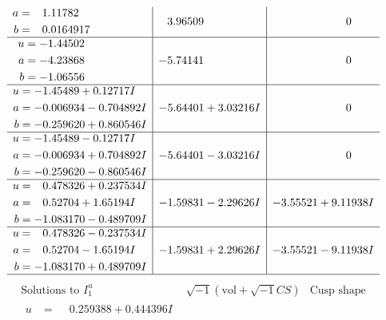 \documentclass[1p]{elsarticle_modified}
\theoremstyle{definition}
\newcommand{\I}{\sqrt{-1}}
\begin{document}
$$\begin{array}{c|c|c}
\begin{aligned}
a &= \phantom{-}1.11782\phantom{ +0.000000I} \\
b &= \phantom{-}0.0164917\phantom{ +0.000000I}\end{aligned}
 & \phantom{-}3.96509\phantom{ +0.000000I} & \phantom{-0.000000 } 0 \\ \hline\begin{aligned}
u &= -1.44502\phantom{ +0.000000I} \\
a &= -4.23868\phantom{ +0.000000I} \\
b &= -1.06556\phantom{ +0.000000I}\end{aligned}
 & -5.74141\phantom{ +0.000000I} & \phantom{-0.000000 } 0 \\ \hline\begin{aligned}
u &= -1.45489 + 0.12717 I \\
a &= -0.006934 - 0.704892 I \\
b &= -0.259620 + 0.860546 I\end{aligned}
 & -5.64401 + 3.03216 I & \phantom{-0.000000 } 0 \\ \hline\begin{aligned}
u &= -1.45489 - 0.12717 I \\
a &= -0.006934 + 0.704892 I \\
b &= -0.259620 - 0.860546 I\end{aligned}
 & -5.64401 - 3.03216 I & \phantom{-0.000000 } 0 \\ \hline\begin{aligned}
u &= \phantom{-}0.478326 + 0.237534 I \\
a &= \phantom{-}0.52704 + 1.65194 I \\
b &= -1.083170 - 0.489709 I\end{aligned}
 & -1.59831 - 2.29626 I & -3.55521 + 9.11938 I \\ \hline\begin{aligned}
u &= \phantom{-}0.478326 - 0.237534 I \\
a &= \phantom{-}0.52704 - 1.65194 I \\
b &= -1.083170 + 0.489709 I\end{aligned}
 & -1.59831 + 2.29626 I & -3.55521 - 9.11938 I\\
 \hline 
 \end{array}$$\newpage$$\begin{array}{c|c|c}  
\text{Solutions to }I^u_{1}& \I (\text{vol} + \sqrt{-1}CS) & \text{Cusp shape}\\
 \hline 
\begin{aligned}
u &= \phantom{-}0.259388 + 0.444396 I \\

\end{aligned}
\end{array}$$
\end{document}
